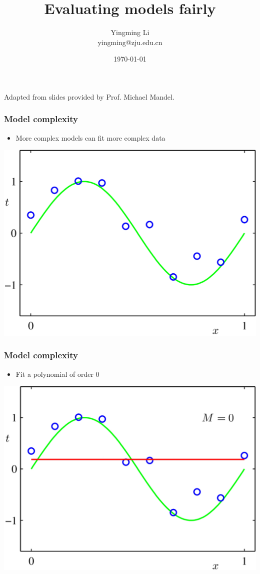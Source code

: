\documentclass[12pt,notes,mathserif]{beamer}
\title[]{Evaluating models fairly}
\author[YingmingLi]{Yingming Li \\ yingming@zju.edu.cn}
\institute[DSERC, ZJU]{Data Science \& Engineering Research Center, ZJU}
\date[\today]{\today}
\begin{document}

\begin{frame}[c]
	\titlepage
	\begin{center}
		Adapted from slides provided by Prof.  Michael Mandel.
	\end{center}
\end{frame}

\begin{frame}[c]
	\frametitle{Model complexity}
	\begin{itemize}
		\item More complex models can fit more complex data
	\end{itemize}
	\begin{center}
		\includegraphics[width=0.61\linewidth]{fig/lec52.jpg}
	\end{center}
\end{frame}
\begin{frame}[c]
	\frametitle{Model complexity}
	\begin{itemize}
		\item Fit a polynomial of order 0
	\end{itemize}
	\begin{center}
		\includegraphics[width=0.61\linewidth]{fig/lec53.jpg}
	\end{center}
\end{frame}
\end{document}
